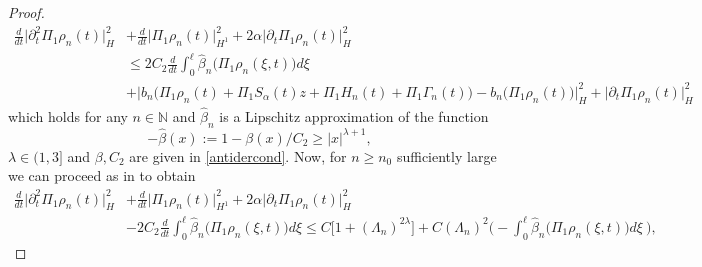 \documentclass[10pt, reqno]{amsart}
\newcommand{\N}{\mathbb{N}}
\theoremstyle{definition}
\numberwithin{lem}{section}
\numberwithin{cor}{section}
\numberwithin{prop}{section}
\numberwithin{thm}{section}
\numberwithin{dfn}{section}
\begin{document}
\begin{proof}
    	   \begin{equation*}
    	  \begin{aligned}
    	   \frac{d}{dt}\big|\partial^2_t\Pi_1 \rho_{n}(t)\big|^2_{H}&+	\frac{d}{dt}\big| \Pi_1\rho_{n}(t)\big|
    	   ^2_{H^1}+2\alpha \big|\partial_t\Pi_1 \rho_{n}(t)\big|^2_{H}\\&\leq 2C_2\frac{d}{dt}\int_{0}^{\ell}\hat{\beta}_n\big( \Pi_1\rho_n(\xi, t) \big)d\xi\\&+\big|b_n\big(\Pi_1 \rho_n(t)+\Pi_1S_\alpha(t)z+\Pi_1H_{n}(t)+\Pi_1\Gamma_{n}(t)\big)-b_n\big(\Pi_1 \rho_n(t)\big)
    	   \big|^2_{H}+\big|  \partial_t\Pi_1\rho_{n}(t) \big|^2_{H}
    	   \end{aligned}
    	   \end{equation*}
    	   which holds for any $n\in\N$ and $\hat{\beta}_n$ is a Lipschitz approximation of the function
    	   \begin{equation}
    	        -\hat\beta(x):=1-\beta(x)/C_2\geq |x|^{\lambda+1},\label{Eq:betahat}
    	        \end{equation}
    	        $\lambda \in(1,3]$
    	   and $\beta, C_2$ are given in \eqref{antidercond}. Now, for $n\geq n_0$ sufficiently large we can proceed as in \cite[pp. 678-679 ]{cerrai2006smoluchowski} to obtain 
    	   \begin{equation*}
    	   \begin{aligned}
    	  \frac{d}{dt}\big|\partial^2_t\Pi_1 \rho_{n}(t)\big|^2_{H}&+	\frac{d}{dt}\big| \Pi_1\rho_{n}(t)\big|^2_{H^1}+2\alpha \big|\partial_t\Pi_1 \rho_{n}(t)\big|^2_{H}\\&-2C_2\frac{d}{dt}\int_{0}^{\ell}\hat{\beta}_n\big(\Pi_1 \rho_n(\xi, t) \big)d\xi\leq C\bigg[1+(\Lambda_n)^{2\lambda}   \bigg]+C(\Lambda_n)^2\bigg(-\int_{0}^{\ell}\hat{\beta}_n\big( \Pi_1\rho_n(\xi, t) \big)d\xi\ \bigg),
    	   \end{aligned}
    	   \end{equation*}
    	   

\end{proof}
\end{document}
